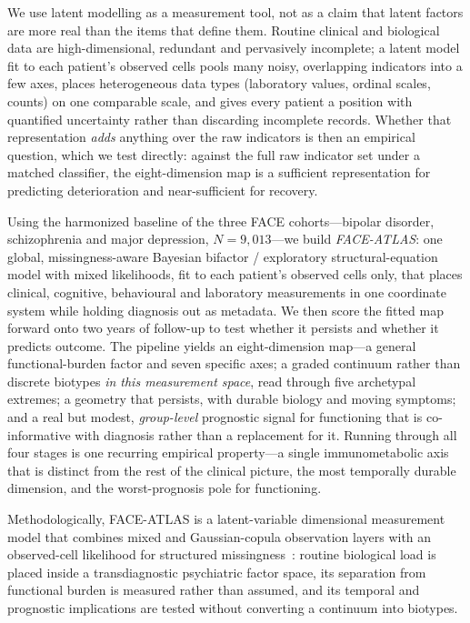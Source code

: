 We use latent modelling as a measurement tool, not as a claim that latent factors are more
real than the items that define them. Routine clinical and biological data are
high-dimensional, redundant and pervasively incomplete; a latent model fit to each patient's
observed cells pools many noisy, overlapping indicators into a few axes, places heterogeneous
data types (laboratory values, ordinal scales, counts) on one comparable scale, and gives
every patient a position with quantified uncertainty rather than discarding incomplete
records. Whether that representation \emph{adds} anything over the raw indicators is then an
empirical question, which we test directly: against the full raw indicator set under a matched
classifier, the eight-dimension map is a sufficient representation for predicting deterioration
and near-sufficient for recovery.

Using the harmonized baseline of the three FACE cohorts---bipolar disorder, schizophrenia and
major depression, $N=9{,}013$---we build \emph{FACE-ATLAS}: one global, missingness-aware
Bayesian bifactor / exploratory structural-equation model with mixed likelihoods, fit to each
patient's observed cells only, that places clinical, cognitive, behavioural and laboratory
measurements in one coordinate system while holding diagnosis out as metadata. We then score
the fitted map forward onto two years of follow-up to test whether it persists and whether it
predicts outcome. The pipeline yields an eight-dimension map---a general functional-burden factor
and seven specific axes; a graded continuum rather than discrete biotypes \emph{in this
measurement space}, read through five archetypal extremes; a geometry that persists, with durable
biology and moving symptoms; and a real but modest, \emph{group-level} prognostic signal for
functioning that is co-informative with diagnosis rather than a replacement for it. Running
through all four stages is one recurring empirical property---a single immunometabolic axis that
is distinct from the rest of the clinical picture, the most temporally durable dimension, and the
worst-prognosis pole for functioning.

Methodologically, FACE-ATLAS is a latent-variable dimensional measurement model that combines mixed and Gaussian-copula observation layers with an observed-cell likelihood for structured missingness~\citep{reise2012bifactor,asparouhov2009esem,muthen2012bayesian}: routine biological load is placed inside a transdiagnostic psychiatric factor space, its separation from functional burden is measured rather than assumed, and its temporal and prognostic implications are tested without converting a continuum into biotypes.
